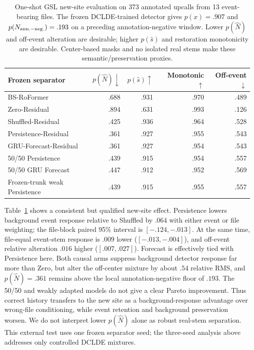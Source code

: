 \documentclass[conference]{IEEEtran}
\begin{document}
\begin{table}[t]
\caption{One-shot GSL new-site evaluation on 373 annotated upcalls from 13
event-bearing files. The frozen DCLDE-trained detector gives
$p(x)=.907$ and $p(N_{\rm ann.-neg.})=.193$ on a preceding annotation-negative
window. Lower $p(\hat N)$ and off-event alteration are desirable; higher
$p(\hat s)$ and restoration monotonicity are desirable. Center-based masks
and no isolated real stems make these semantic/preservation proxies.}
\label{tab:gsl}\centering\footnotesize
\begin{tabular}{lrrrr}
\toprule
Frozen separator & $p(\hat N)\downarrow$ & $p(\hat s)\uparrow$ & Monotonic $\uparrow$ & Off-event $\downarrow$\\
\midrule
BS-RoFormer & .688 & .931 & .970 & .489\\
Zero-Residual & .894 & .631 & .993 & .126\\
Shuffled-Residual & .425 & .936 & .964 & .528\\
Persistence-Residual & .361 & .927 & .955 & .543\\
GRU-Forecast-Residual & .361 & .927 & .954 & .543\\
50/50 Persistence & .439 & .915 & .954 & .557\\
50/50 GRU Forecast & .447 & .912 & .952 & .569\\
Frozen-trunk weak Persistence & .439 & .915 & .955 & .557\\
\bottomrule
\end{tabular}
\end{table}

Table~\ref{tab:gsl} shows a consistent but qualified new-site effect.
Persistence lowers background event response relative to Shuffled by $.064$
with either event or file weighting; the file-block paired 95\% interval is
$[-.124,-.013]$. At the same time, file-equal event-stem response is $.009$
lower ($[-.013,-.004]$), and off-event relative alteration $.016$ higher
($[.007,.027]$). Forecast is effectively tied with Persistence here.
Both causal arms suppress background detector response far more than Zero,
but alter the off-center mixture by about $.54$ relative RMS, and
$p(\hat N)=.361$ remains above the local annotation-negative floor of $.193$.
The 50/50 and weakly adapted models do not give a clear Pareto improvement.
Thus correct history transfers to the new site as a background-response
advantage over wrong-file conditioning, while event retention and background
preservation worsen. We do not interpret lower $p(\hat N)$ alone as robust
real-stem separation. This external test uses one frozen separator seed;
the three-seed analysis above addresses only controlled DCLDE mixtures.
\end{document}
